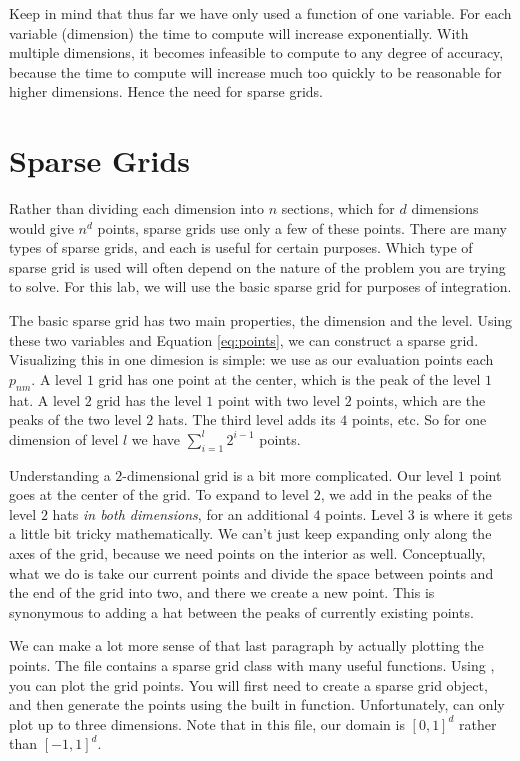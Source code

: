 Keep in mind that thus far we have only used a function of one variable.  For each variable (dimension) the time to compute will increase exponentially.   With multiple dimensions, it becomes infeasible to compute to any degree of accuracy, because the time to compute will increase much too quickly to be reasonable for higher dimensions.  Hence the need for sparse grids.

\section*{Sparse Grids}
Rather than dividing each dimension into $n$ sections, which for $d$ dimensions would give $n^d$ points, sparse grids use only a few of these points.  There are many types of sparse grids, and each is useful for certain purposes.  Which type of sparse grid is used will often depend on the nature of the problem you are trying to solve.  For this lab, we will use the basic sparse grid for purposes of integration.

The basic sparse grid has two main properties, the dimension and the level.  Using these two variables and Equation \ref{eq:points}, we can construct a sparse grid.  Visualizing this in one dimesion is simple: we use as our evaluation points each $p_{nm}$.  A level $1$ grid has one point at the center, which is the peak of the level $1$ hat.  A level $2$ grid has the level $1$ point with two level $2$ points, which are the peaks of the two level $2$ hats.  The third level adds its $4$ points, etc.  So for one dimension of level $l$ we have $\sum_{i=1}^l 2^{i-1}$ points.

Understanding a $2$-dimensional grid  is a bit more complicated.  Our level $1$ point goes at the center of the grid.  To expand to level $2$, we add in the peaks of the level $2$ hats \emph{in both dimensions}, for an additional $4$ points.  Level $3$ is where it gets a little bit tricky mathematically.  We can't just keep expanding only along the axes of the grid, because we need points on the interior as well.  Conceptually, what we do is take our current points and divide the space between points and the end of the grid into two, and there we create a new point.  This is synonymous to adding a hat between the peaks of currently existing points.

We can make a lot more sense of that last paragraph by actually plotting the points.  The file  contains a sparse grid class with many useful functions.  Using , you can plot the grid points.  You will first need to create a sparse grid object, and then generate the points using the built in function.  Unfortunately,  can only plot up to three dimensions.  Note that in this file, our domain is $[0,1]^d$ rather than $[-1,1]^d$.  

